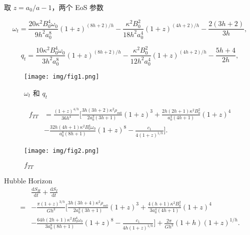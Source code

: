 \documentclass[9pt, dvipsnames]{beamer} %
\begin{document}
\begin{frame}
    取 $z=a_0/a - 1$，两个 EoS 参数

    $$
    \omega_t
    =\frac{20\kappa^2 B_0^4 \omega_0 }{9h^2a_0^8 } \left(1+z \right)^{(8h+2)/h} - \frac{\kappa^2 B_0^2 }{18h^2 a_0^4 } (1+z)^{(4h+2)/h} - \frac{2(3h+2) }{3h } ,
    $$

    $$
    q_t
    =\frac{10\kappa^2 B_0^4 \omega_0 }{3h^2 a_0^8 } (1+z)^{(8h+2)/h} - \frac{\kappa^2 B_0^2 }{12 h^2 a_0^4 } (1+z)^{(4h+2)/h} - \frac{5h+4 }{2h } ,
    $$

    \begin{figure}
        \centering
        \texttt{[image: img/fig1.png]}
        \caption{$\omega_t$ 和 $q_t$}
    \end{figure}
    
\end{frame}

\begin{frame}

    $$
    \begin{aligned}
        f_{TT}
        &=\frac{(1+z)^{4/h} }{36h^4 } \bigg[\frac{3h(3h+2)\kappa^2\rho_{m0} }{2a_0^3(3h+1) }(1+z)^3 + \frac{2h(2h+1)\kappa^2 B_0^2 }{a_0^4(4h+1) } (1+z)^4 \\
        &- \frac{32h(4h+1)\kappa^2 B_0^4 \omega_0 }{a_0^8 (8h+1) } (1+z)^8 - \frac{c_1 }{4(1+z)^{1/h} }   \bigg].
    \end{aligned}
    $$
    \begin{figure}
        \centering
        \texttt{[image: img/fig2.png]}
        \caption{$f_{TT}$}
    \end{figure}   
\end{frame}

\begin{frame}{Hubble Horizon}
    $$
    \begin{aligned}
        &\frac{\mathrm{d}S_H }{\mathrm{d}t } + \frac{\mathrm{d}S_I }{\mathrm{d}t } \\
        =&-\frac{\pi(1+z)^{3/h} }{Gh^3 } \bigg[\frac{3h(3h+4)\kappa^2\rho_{m0} }{2a_0^3(3h+1) }(1+z)^3 + \frac{4(h+1)\kappa^2 B_0^2 }{3a_0^4(4h+1) } (1+z)^4 \\
        &- \frac{64h(2h+1)\kappa^2 B_0^4 \omega_0 }{3a_0^8 (8h+1) } (1+z)^8- \frac{c_1 }{4h(1+z)^{1/h} } \bigg] + \frac{2\pi }{G h^3 } (1+h)(1+z)^{1/h}.
    \end{aligned}
    $$
\end{frame}
\end{document}
